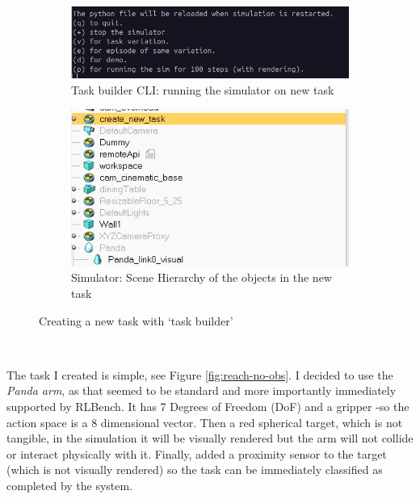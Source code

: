 \begin{figure}[htbp]
  \vspace{0.5cm}
  
  \begin{subfigure}{0.48\linewidth}
    \centering
    \includegraphics[width=\linewidth]{assets/early-work/task-builder-cli-2.png}
    \caption{Task builder CLI: running the simulator on new task}
  \end{subfigure}
  \hfill
  \begin{subfigure}{0.48\textwidth}
    \centering
    \includegraphics[width=\linewidth]{assets/early-work/task-builder-scene-hierarchy.png}
    \caption{Simulator: Scene Hierarchy of the objects in the new task}
  \end{subfigure}
  \caption{Creating a new task with `task builder'}\label{fig:task-builder}
\end{figure}\


The task I created is simple, see Figure \ref{fig:reach-no-obs}. I decided to use the \emph{Panda arm}, as that seemed to be standard and more importantly immediately supported by RLBench. It has 7 Degrees of Freedom (DoF) and a gripper -so the action space is a 8 dimensional vector. Then a red spherical target, which is not tangible, in the simulation it will be visually rendered but the arm will not collide or interact physically with it. Finally, added a proximity sensor to the target (which is not visually rendered) so the task can be immediately classified as completed by the system.



